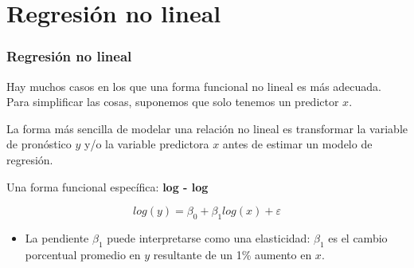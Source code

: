 \documentclass[10pt]{beamer}
\begin{document}



\section{Regresión no lineal}




\begin{frame}[fragile]
\frametitle{Regresión no lineal}

Hay muchos casos en los que una forma funcional no lineal es más adecuada. Para simplificar las cosas, suponemos que solo tenemos un predictor $x$.

\vspace{4mm}
\pause

La forma más sencilla de modelar una relación no lineal es transformar la variable de pronóstico $y$ y/o la variable predictora $x$ antes de estimar un modelo de regresión. 

\pause
\vspace{4mm}
Una forma funcional específica: \textbf{log - log}

\begin{equation}
log (y) = \beta_0 +  \beta_1 log(x) + \varepsilon
\end{equation}

\begin{itemize}
\item La pendiente  $\beta_1$ puede interpretarse como una elasticidad:  
$\beta_1$ es el cambio porcentual promedio en $y$ resultante de un 1\%  aumento en $x$.
\end{itemize}


\end{frame}


\end{document}
